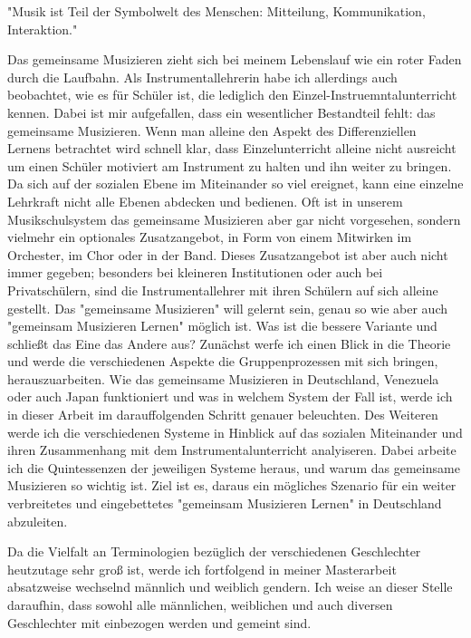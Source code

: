 
"Musik ist Teil der Symbolwelt des Menschen: Mitteilung, Kommunikation,
Interaktion." \autocite[91]{doerne:umfassend_musizieren}

Das gemeinsame Musizieren zieht sich bei meinem Lebenslauf wie ein roter Faden
durch die Laufbahn. Als Instrumentallehrerin habe ich allerdings auch
beobachtet, wie es für Schüler ist, die lediglich den
Einzel-Instruemntalunterricht kennen. Dabei ist mir aufgefallen, dass ein
wesentlicher Bestandteil fehlt: das
gemeinsame Musizieren. Wenn man alleine den Aspekt des
Differenziellen Lernens betrachtet wird schnell klar, dass Einzelunterricht
alleine nicht ausreicht um einen Schüler motiviert am Instrument zu halten und
ihn weiter zu bringen. Da sich auf der sozialen Ebene im Miteinander so viel
ereignet, kann eine einzelne Lehrkraft nicht alle Ebenen abdecken und bedienen.
Oft ist in unserem Musikschulsystem das gemeinsame Musizieren aber gar nicht
vorgesehen, sondern vielmehr ein optionales Zusatzangebot, in Form von einem
Mitwirken im Orchester, im Chor
oder in der Band. Dieses Zusatzangebot ist aber auch nicht immer gegeben;
besonders bei kleineren Institutionen oder auch bei Privatschülern, sind die
Instrumentallehrer mit ihren Schülern auf sich alleine gestellt. 
Das "gemeinsame Musizieren" will gelernt sein, genau so wie 
aber auch "gemeinsam Musizieren Lernen" möglich ist. Was ist die bessere
Variante und schließt das Eine das Andere aus? Zunächst werfe ich einen Blick in
die Theorie und werde die verschiedenen Aspekte die Gruppenprozessen mit sich
bringen, herauszuarbeiten.
Wie das gemeinsame Musizieren in Deutschland,
Venezuela oder auch Japan funktioniert und was in welchem System der Fall ist,
werde ich in dieser Arbeit im darauffolgenden Schritt
genauer beleuchten. Des Weiteren werde ich die verschiedenen
Systeme in Hinblick auf das sozialen Miteinander und ihren Zusammenhang mit
dem Instrumentalunterricht analyiseren. Dabei arbeite ich die Quintessenzen der
jeweiligen Systeme heraus, und warum das gemeinsame Musizieren so
wichtig ist. Ziel ist es, daraus ein mögliches Szenario für ein weiter
verbreitetes und eingebettetes 
"gemeinsam Musizieren Lernen" in Deutschland abzuleiten.


Da die Vielfalt an Terminologien bezüglich der verschiedenen
Geschlechter heutzutage sehr groß ist, werde ich fortfolgend in meiner Masterarbeit
absatzweise wechselnd männlich und weiblich gendern. Ich weise an dieser Stelle
daraufhin, dass sowohl alle männlichen, weiblichen und auch diversen
Geschlechter mit einbezogen werden und gemeint sind. 
